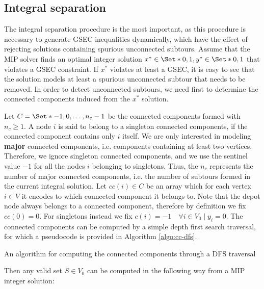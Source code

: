 \subsection{Integral separation}
\label{sec:impl-integral-separation}

The integral separation procedure is the most important, as this procedure is necessary to generate GSEC inequalities dynamically, which have the effect of rejecting solutions containing spurious unconnected subtours.
Assume that the MIP solver finds an optimal integer solution $x^* \in \Set*{0, 1}, y^* \in \Set*{0, 1}$ that violates a GSEC constraint.
If $x^*$ violates at least a GSEC, it is easy to see that the solution models at least a spurious unconnected subtour that needs to be removed.
In order to detect unconnected subtours, we need first to determine the connected components induced from the $x^*$ solution.

Let $C = \Set*{-1, 0, \dots, n_c - 1}$ be the connected components formed with $n_c \ge 1$.
A node $i$ is said to belong to a singleton connected components, if the connected component contains only $i$ itself.
We are only interested in modeling \textbf{major} connected components, i.e. components containing at least two vertices.
Therefore, we ignore singleton connected components, and we use the sentinel value $-1$ for all the nodes $i$ belonging to singletons.
Thus, the $n_c$ represents the number of major connected components, i.e. the number of subtours formed in the current integral solution.
Let $cc(i) \in C$ be an array which for each vertex $i \in V$ it encodes to which connected component it belongs to.
Note that the depot node always belongs to a connected component, therefore by definition we fix $cc(0) = 0$.
For singletons instead we fix $c(i) = -1  \quad \forall i \in V_0 \mid y_i = 0$.
The connected components can be computed by a simple depth first search traversal, for which a pseudocode is provided in Algorithm \ref{algo:cc-dfs}.

\begin{algorithm}
	\caption{An algorithm for computing the connected components through a DFS traversal}
	
	\label{algo:cc-dfs}
\end{algorithm}

Then any valid set $S \in V_0$ can be computed in the following way from a MIP integer solution:

